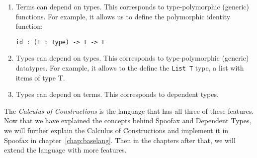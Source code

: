 \begin{enumerate}
	\item Terms can depend on types. This corresponds to type-polymorphic (generic) functions. For example, it allows us to define the polymorphic identity function:
	\begin{lstlisting}
id : (T : Type) -> T -> T
	\end{lstlisting}
	\item Types can depend on types. This corresponds to type-polymorphic (generic) datatypes. For example, it allows to the define the \verb|List T| type, a list with items of type T.
	
	\item Types can depend on terms. This corresponds to dependent types.
\end{enumerate}

The \textit{Calculus of Constructions} is the language that has all three of these features. Now that we have explained the concepts behind Spoofax and Dependent Types, we will further explain the Calculus of Constructions and implement it in Spoofax in chapter~\ref{chap:baselang}. Then in the chapters after that, we will extend the language with more features.